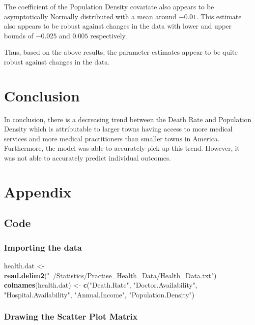 \documentclass[12pt,]{article}
\newenvironment{Shaded}{\begin{snugshade}}{\end{snugshade}}
\newcommand{\KeywordTok}[1]{\textcolor[rgb]{0.13,0.29,0.53}{\textbf{#1}}}
\newcommand{\StringTok}[1]{\textcolor[rgb]{0.31,0.60,0.02}{#1}}
\newcommand{\NormalTok}[1]{#1}
\begin{document}
The coefficient of the Population Density covariate also appears to be
asymptotically Normally distributed with a mean around \(-0.01\). This
estimate also appears to be robust against changes in the data with
lower and upper bounds of \(-0.025\) and \(0.005\) respectively.

Thus, based on the above results, the parameter estimates appear to be
quite robust against changes in the data.

\section{Conclusion}\label{conclusion}

In conclusion, there is a decreasing trend between the Death Rate and
Population Density which is attributable to larger towns having access
to more medical services and more medical practitioners than smaller
towns in America. Furthermore, the model was able to accurately pick up
this trend. However, it was not able to accurately predict individual
outcomes.

\section{Appendix}\label{appendix}

\subsection{Code}\label{code}

\subsubsection{Importing the data}\label{importing-the-data}

\begin{Shaded}
\begin{Highlighting}[]
\NormalTok{health.dat <-}\StringTok{ }\KeywordTok{read.delim2}\NormalTok{(}\StringTok{"~/Statistics/Practise_Health_Data/Health_Data.txt"}\NormalTok{)}
\KeywordTok{colnames}\NormalTok{(health.dat) <-}\StringTok{ }\KeywordTok{c}\NormalTok{(}\StringTok{"Death.Rate"}\NormalTok{, }\StringTok{"Doctor.Availability"}\NormalTok{, }\StringTok{"Hospital.Availability"}\NormalTok{, }
    \StringTok{"Annual.Income"}\NormalTok{, }\StringTok{"Population.Density"}\NormalTok{)}
\end{Highlighting}
\end{Shaded}

\subsubsection{Drawing the Scatter Plot
Matrix}\label{drawing-the-scatter-plot-matrix}
\end{document}
